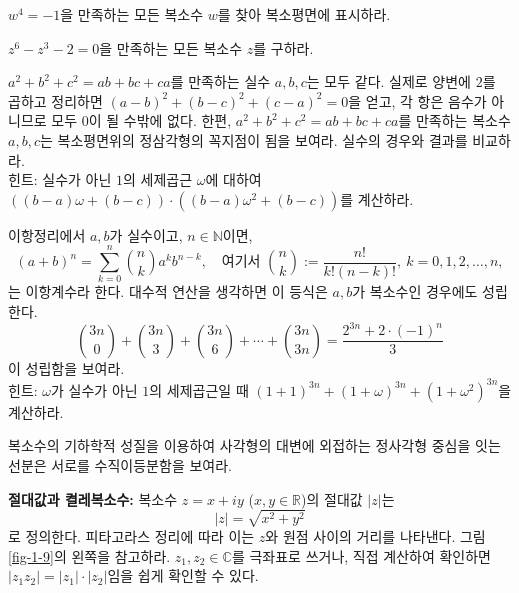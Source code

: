 \begin{salt_exercise} \label{ex-1-9}
$w^4=-1$을 만족하는 모든 복소수 $w$를 찾아
복소평면에 표시하라.
\end{salt_exercise}

\begin{salt_exercise} \label{ex-1-10}
$z^6-z^3-2=0$을 만족하는 모든 복소수 $z$를 구하라.
\end{salt_exercise}

\begin{salt_exercise} \label{ex-1-11}
$a^2+b^2+c^2= ab+bc+ca$를 만족하는 실수 $a,b,c$는 모두 같다.
실제로 양변에 $2$를 곱하고 정리하면
$(a-b)^2+(b-c)^2+(c-a)^2=0$을 얻고, 
각 항은 음수가 아니므로 모두 $0$이 될 수밖에 없다.
한편, $a^2+b^2+c^2= ab+bc+ca$를 만족하는 복소수 $a,b,c$는
복소평면위의 정삼각형의 꼭지점이 됨을 보여라.
실수의 경우와 결과를 비교하라. \\[1ex]
힌트: 실수가 아닌 $1$의 세제곱근 $\omega$에 대하여
$((b-a)\omega + (b-c))\cdot((b-a)\omega^2 + (b-c))$를 계산하라.
\end{salt_exercise}

\begin{salt_exercise} \label{ex-1-12}
이항정리에서
$a,b$가 실수이고, $n\in\mathbb N$이면,
$$
(a+b)^n = \sum_{k=0}^n {n \choose k}a^kb^{n-k},
\quad
\text{여기서 }
{n \choose k} := \frac{n!}{k!(n-k)!}, \
k=0,1,2,\ldots, n,
$$
는 이항계수라 한다.
대수적 연산을 생각하면 이 등식은 $a,b$가 복소수인 경우에도 성립한다.
$$
{3n \choose 0} + {3n \choose 3} + {3n \choose 6} + \cdots
+ {3n \choose 3n} = \dfrac{2^{3n} + 2\cdot(-1)^n}3
$$
이 성립함을 보여라. \\[1ex]
힌트: $\omega$가 실수가 아닌 $1$의 세제곱근일 때
$(1+1)^{3n} + (1+\omega)^{3n} + (1+\omega^2)^{3n}$을 계산하라.
\end{salt_exercise}

\begin{salt_exercise} \label{ex-1-13}
복소수의 기하학적 성질을 이용하여 
사각형의 대변에 외접하는 정사각형 중심을 잇는 선분은
서로를 수직이등분함을 보여라.
\end{salt_exercise}

{\bf 절대값과 켤레복소수: }
복소수 $z=x+iy$ ($x,y\in\mathbb R$)의 절대값 $|z|$는
$$
|z| = \sqrt{x^2+y^2}
$$
로 정의한다.
피타고라스 정리에 따라 이는 $z$와 원점 사이의 거리를 나타낸다.
그림 \ref{fig-1-9}의 왼쪽을 참고하라.
$z_1, z_2\in \mathbb C$를 극좌표로 쓰거나, 직접 계산하여 확인하면
$|z_1z_2| = |z_1|\cdot |z_2|$임을 쉽게 확인할 수 있다.

